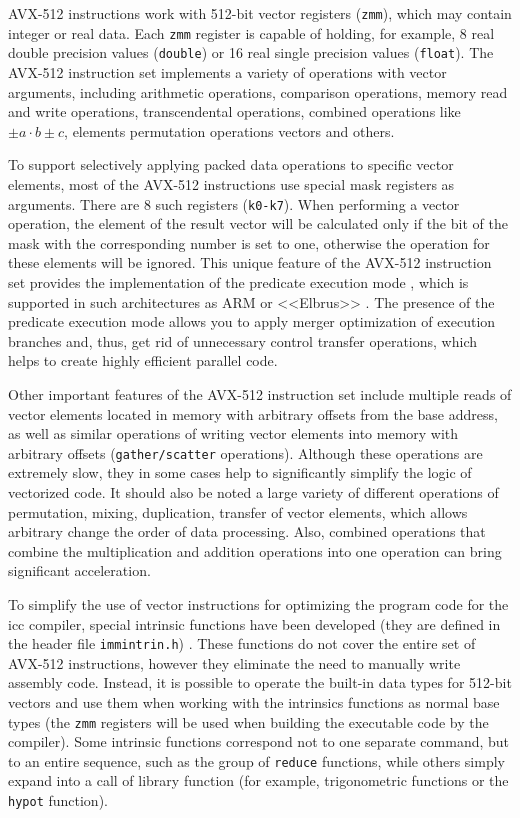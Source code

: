 \documentclass[utf8,english]{psta}%
\begin{document}
AVX-512 instructions work with 512-bit vector registers (\texttt{zmm}), which may contain integer or real data.
Each \texttt{zmm} register is capable of holding, for example, 8 real double precision values (\texttt{double}) or 16 real single precision values (\texttt{float}).
The AVX-512 instruction set implements a variety of operations with vector arguments, including arithmetic operations, comparison operations, memory read and write operations, transcendental operations, combined operations like $\pm a \cdot b \pm c$, elements permutation operations vectors and others.

To support selectively applying packed data operations to specific vector elements, most of the AVX-512 instructions use special mask registers as arguments.
There are 8 such registers (\texttt{k0-k7}).
When performing a vector operation, the element of the result vector will be calculated only if the bit of the mask with the corresponding number is set to one, otherwise the operation for these elements will be ignored.
This unique feature of the AVX-512 instruction set provides the implementation of the predicate execution mode \cite{VolOkuPred}, which is supported in such architectures as ARM or <<Elbrus>> \cite{KimElbrus}.
The presence of the predicate execution mode allows you to apply merger optimization of execution branches and, thus, get rid of unnecessary control transfer operations, which helps to create highly efficient parallel code.

Other important features of the AVX-512 instruction set include multiple reads of vector elements located in memory with arbitrary offsets from the base address, as well as similar operations of writing vector elements into memory with arbitrary offsets (\texttt{gather/scatter} operations).
Although these operations are extremely slow, they in some cases help to significantly simplify the logic of vectorized code.
It should also be noted a large variety of different operations of permutation, mixing, duplication, transfer of vector elements, which allows arbitrary change the order of data processing.
Also, combined operations that combine the multiplication and addition operations into one operation can bring significant acceleration.

To simplify the use of vector instructions for optimizing the program code for the icc compiler, special intrinsic functions have been developed (they are defined in the header file \texttt{immintrin.h}) \cite{IntelIntrGuide}.
These functions do not cover the entire set of AVX-512 instructions, however they eliminate the need to manually write assembly code.
Instead, it is possible to operate the built-in data types for 512-bit vectors and use them when working with the intrinsics functions as normal base types (the \texttt{zmm} registers will be used when building the executable code by the compiler).
Some intrinsic functions correspond not to one separate command, but to an entire sequence, such as the group of \texttt{reduce} functions, while others simply expand into a call of library function (for example, trigonometric functions or the \texttt{hypot} function).
\end{document}
